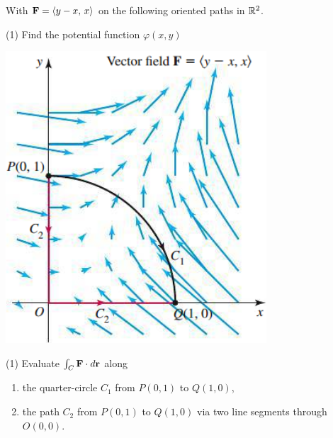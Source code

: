 \documentclass[mathNotesPreamble]{subfiles}
\begin{document}
  \begin{ex*}
     With $\mathbf F={\left\langle y-x,\,x \right\rangle}$ on the following oriented paths in $\mathbb{R}^2$.
  \end{ex*}
  \vspace*{-\baselineskip}
  \noindent
  \begin{minipage}[t]{0.6\linewidth}\mbox{}
    \begin{tasks}[after-item-skip=8\baselineskip, label=\alph*)](1)
      \task 
        Find the potential function $\varphi(x,y)$
    \end{tasks}
  \end{minipage}
  \begin{minipage}[t]{0.4\linewidth}\mbox{}
    \begin{flushright}
      \includegraphics[width=0.75\linewidth]{images/briggs_17_02/fig17_20}
    \end{flushright}
  \end{minipage}
  \begin{tasks}[after-item-skip=\stretch{1}, label=\alph*), resume](1)
    \task 
      Evaluate $\int_C \mathbf F\cdot d{\mathbf{r}}$ along
      \begin{enumerate}[itemsep=6\baselineskip, label=]
        \item 
          the quarter-circle $C_1$ from $P(0,1)$ to $Q(1,0)$,
        \item 
          the path $C_2$ from $P(0,1)$ to $Q(1,0)$ via two line segments through $O(0,0)$.
      \end{enumerate}
  \end{tasks}
  \pagebreak
\end{document}
